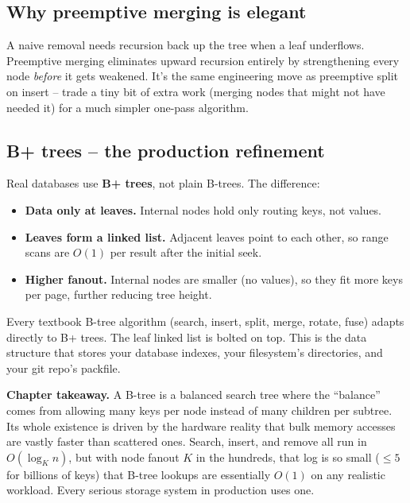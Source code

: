\documentclass[11pt]{article}
\begin{document}
\subsection*{Why preemptive merging is elegant}

\begin{ideabox}
A naive removal needs recursion back up the tree when a leaf underflows. Preemptive merging eliminates upward recursion entirely by strengthening every node \emph{before} it gets weakened. It's the same engineering move as preemptive split on insert -- trade a tiny bit of extra work (merging nodes that might not have needed it) for a much simpler one-pass algorithm.
\end{ideabox}

\subsection*{B+ trees -- the production refinement}

\begin{notebox}
Real databases use \textbf{B+ trees}, not plain B-trees. The difference:
\begin{itemize}[leftmargin=*]
    \item \textbf{Data only at leaves.} Internal nodes hold only routing keys, not values.
    \item \textbf{Leaves form a linked list.} Adjacent leaves point to each other, so range scans are $O(1)$ per result after the initial seek.
    \item \textbf{Higher fanout.} Internal nodes are smaller (no values), so they fit more keys per page, further reducing tree height.
\end{itemize}
Every textbook B-tree algorithm (search, insert, split, merge, rotate, fuse) adapts directly to B+ trees. The leaf linked list is bolted on top. This is the data structure that stores your database indexes, your filesystem's directories, and your git repo's packfile.
\end{notebox}

\begin{ideabox}
\textbf{Chapter takeaway.} A B-tree is a balanced search tree where the ``balance'' comes from allowing many keys per node instead of many children per subtree. Its whole existence is driven by the hardware reality that bulk memory accesses are vastly faster than scattered ones. Search, insert, and remove all run in $O(\log_K n)$, but with node fanout $K$ in the hundreds, that log is so small ($\leq 5$ for billions of keys) that B-tree lookups are essentially $O(1)$ on any realistic workload. Every serious storage system in production uses one.
\end{ideabox}
\end{document}
